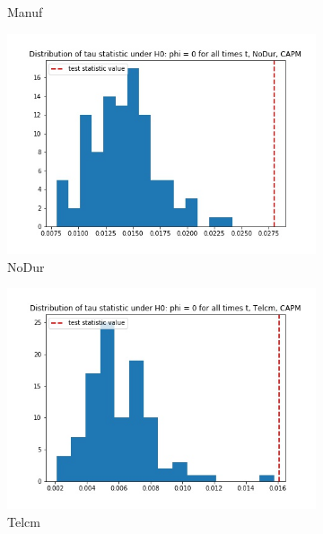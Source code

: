 \documentclass{article}
\begin{document}
\begin{figure}
\begin{subfigure}[b]{0.5\textwidth}
    \caption{Manuf}
    \label{fig:2}
  \end{subfigure}
  \begin{subfigure}[b]{0.5\textwidth}
    \centering
    \includegraphics[width=\textwidth]{NoDur/tau_hist_02_CAPM.jpg}
    \caption{NoDur}
    \label{fig:2}
  \end{subfigure}
  \begin{subfigure}[b]{0.5\textwidth}
    \centering
    \includegraphics[width=\textwidth]{Telcm/tau_hist_02_CAPM.jpg}
    \caption{Telcm}
    \label{fig:2}
  \end{subfigure}
  \begin{subfigure}[b]{0.5\textwidth}
    \centering

\end{subfigure}
\end{figure}
\end{document}
